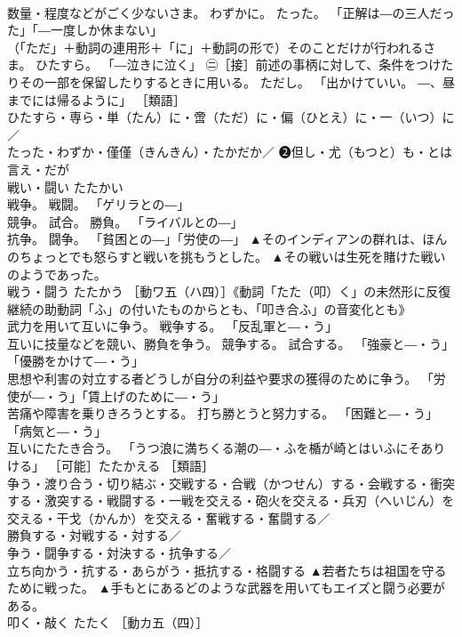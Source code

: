 \documentclass[8pt]{extreport}
\begin{document}
\begin{CJK}{UTF8}{min}
\\	数量・程度などがごく少ないさま。 わずかに。 たった。 「正解は―の三人だった」「―一度しか休まない」 
\\	（「ただ」＋動詞の連用形＋「に」＋動詞の形で）そのことだけが行われるさま。 ひたすら。 「―泣きに泣く」 ㊁［接］前述の事柄に対して、条件をつけたりその一部を保留したりするときに用いる。 ただし。 「出かけていい。 ―、昼までには帰るように」 ［類語］ 
\\	ひたすら・専ら・単（たん）に・啻（ただ）に・偏（ひとえ）に・一（いつ）に／
\\	たった・わずか・僅僅（きんきん）・たかだか／ ❷但し・尤（もつと）も・とは言え・だが	
\\	戦い・闘い	たたかい	
\\	戦争。 戦闘。 「ゲリラとの―」 
\\	競争。 試合。 勝負。 「ライバルとの―」 
\\	抗争。 闘争。 「貧困との―」「労使の―」	▲そのインディアンの群れは、ほんのちょっとでも怒らすと戦いを挑もうとした。 ▲その戦いは生死を賭けた戦いのようであった。
\\	戦う・闘う	たたかう	［動ワ五（ハ四）］《動詞「たた（叩）く」の未然形に反復継続の助動詞「ふ」の付いたものからとも、「叩き合ふ」の音変化とも》 
\\	武力を用いて互いに争う。 戦争する。 「反乱軍と―・う」 
\\	互いに技量などを競い、勝負を争う。 競争する。 試合する。 「強豪と―・う」「優勝をかけて―・う」 
\\	思想や利害の対立する者どうしが自分の利益や要求の獲得のために争う。 「労使が―・う」「賃上げのために―・う」 
\\	苦痛や障害を乗りきろうとする。 打ち勝とうと努力する。 「困難と―・う」「病気と―・う」 
\\	互いにたたき合う。 「うつ浪に満ちくる潮の―・ふを楯が崎とはいふにそありける」 ［可能］たたかえる ［類語］
\\	争う・渡り合う・切り結ぶ・交戦する・合戦（かつせん）する・会戦する・衝突する・激突する・戦闘する・一戦を交える・砲火を交える・兵刃（へいじん）を交える・干戈（かんか）を交える・奮戦する・奮闘する／
\\	勝負する・対戦する・対する／
\\	争う・闘争する・対決する・抗争する／
\\	立ち向かう・抗する・あらがう・抵抗する・格闘する	▲若者たちは祖国を守るために戦った。 ▲手もとにあるどのような武器を用いてもエイズと闘う必要がある。
\\	叩く・敲く	たたく	［動カ五（四）］ 

\end{CJK}
\end{document}

